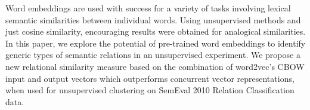 Word embeddings are used with success for a variety of tasks involving lexical semantic similarities between individual words. Using unsupervised methods and just cosine similarity, encouraging results were obtained for analogical similarities. In this paper, we explore the potential of pre-trained word embeddings to identify generic types of semantic relations in an unsupervised experiment. We propose a new relational similarity measure based on the combination of word2vec's CBOW input and output vectors which outperforms concurrent vector representations, when used for unsupervised clustering on SemEval 2010 Relation Classification data.
